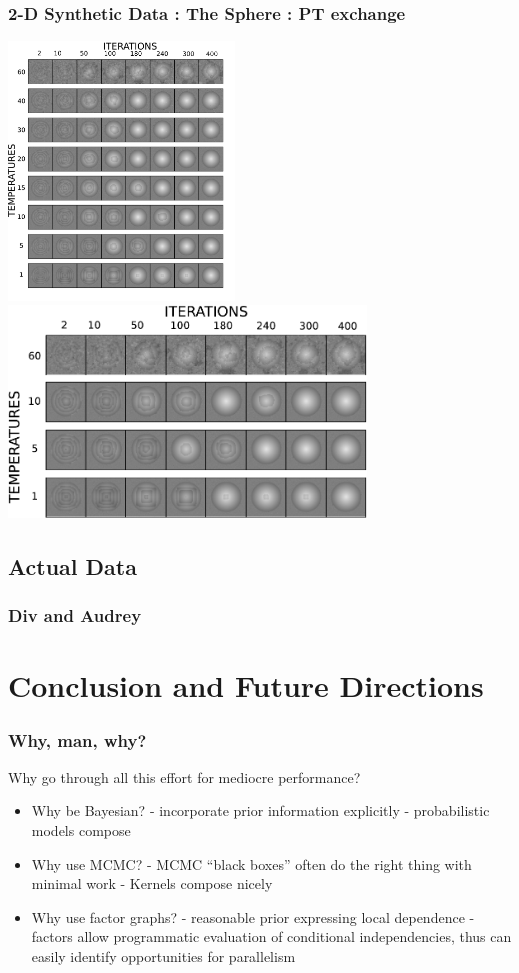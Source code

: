 \documentclass[compress]{beamer}
\begin{document}
\begin{frame}
  \frametitle{2-D Synthetic Data : The Sphere : PT exchange}
   {
    \includegraphics[width=6cm]{sphere_replica}
  }
   {
    \includegraphics[width=9.5cm]{sphere_replica_zoom}
  }
\end{frame}

\subsection{Actual Data}
\begin{frame}
  \frametitle{Div and Audrey}
\end{frame}

\section{Conclusion and Future Directions}
\frame{\tableofcontents[currentsection]}

\begin{frame}
  \frametitle{Why, man, why?}
  Why go through all this effort for mediocre performance? 
  \begin{itemize}[<+->]
    \item Why be Bayesian?  
       - incorporate prior information explicitly
       - probabilistic models compose
    \item Why use MCMC? 
       - MCMC ``black boxes'' often do the right thing with minimal work
       - Kernels compose nicely \cite{Bonawitz_Composable_2008}
    \item Why use factor graphs? 
       - reasonable prior expressing local dependence 
       - factors allow programmatic evaluation of conditional independencies, 
       thus can easily identify opportunities for parallelism
  \end{itemize}
  
\end{frame}
\end{document}

